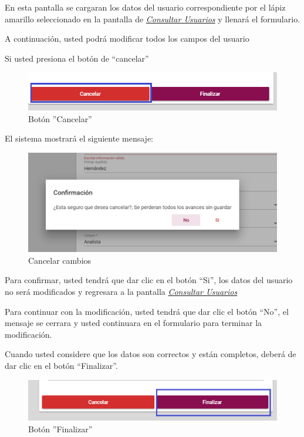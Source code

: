                 En esta pantalla se cargaran los datos del usuario correspondiente por el lápiz amarillo seleccionado en la pantalla de \hyperlink{consultarUs}{\textit{Consultar Usuarios}} y llenará el formulario.
            
                A continuación, usted podrá modificar todos los campos del usuario
                               
                Si usted presiona el botón de “cancelar”
                
                \begin{figure}[!hbtp]
                    \centering
                    \hypertarget{cancel2}{\includegraphics[width=0.7\linewidth]{images/SP5/BtnCancelar2}}
                    \caption{Botón ''Cancelar''}
                    \label{cancel2}
                \end{figure}
                
                El sistema mostrará el siguiente mensaje:
                  \clearpage
                 \begin{figure}[!hbtp]
                	\centering
                    \includegraphics[width=0.4\linewidth]{images/SP5/MSG29}
                	\caption{Cancelar cambios}
                	\label{mensaje29}
             
                \end{figure}
              
                Para confirmar, usted tendrá que dar clic en el botón “Si”, los datos del usuario no será modificados  y regresara a la pantalla \hyperlink{consultarUs}{\textit{Consultar Usuarios}}
            
                Para continuar con la modificación, usted tendrá que  dar clic el botón “No”, el mensaje se cerrara y usted continuara en el formulario para terminar la modificación.
                
                Cuando usted considere que los datos son correctos y están completos, deberá de dar clic en el botón “Finalizar”.
                \begin{figure}[!hbtp]
                    \centering
                    \hypertarget{btnfin}{\includegraphics[width=0.7\linewidth]{images/SP5/BtnFinalizar}}
                    \caption{Botón ''Finalizar''}
                    \label{btnfin}
                \end{figure}
                

